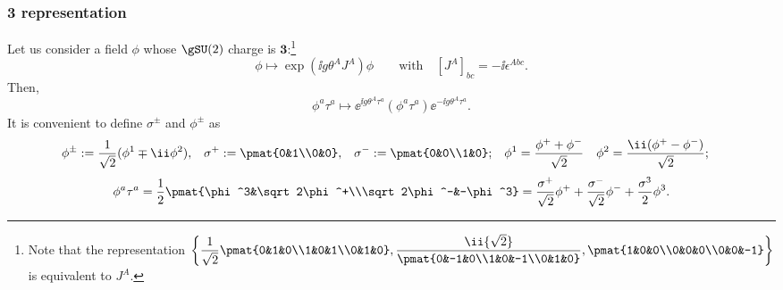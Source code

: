 \subsubsection{$\boldsymbol 3$ representation}
Let us consider a field $\phi$ whose $\gSU(2)$ charge is $\boldsymbol 3$:\footnote{
Note that the representation $\left\{
\dfrac1{\sqrt2}\pmat{0&1&0\\1&0&1\\0&1&0},
\dfrac\ii{\sqrt2}\pmat{0&-1&0\\1&0&-1\\0&1&0},
\pmat{1&0&0\\0&0&0\\0&0&-1}
\right\}$ is equivalent to $J^A$.}
\begin{equation}
 \phi\mapsto\exp\left(\ii g\theta^A J^A\right)\phi
\qquad\text{with}\quad [J^A]_{bc}=-\ii\epsilon^{Abc}.
\end{equation}
Then,
\begin{equation}
 \phi^a\tau^a\mapsto
\ee^{\ii g\theta^A\tau^a}
 \left(\phi^a\tau^a\right)
\ee^{-\ii g\theta^A\tau^a}.
\end{equation}
It is convenient to define $\sigma^\pm$ and  $\phi^\pm$ as
\begin{align}
 \phi^\pm   &:= \frac1{\sqrt2}(\phi^1\mp\ii\phi^2),&
 \sigma^+ &:= \pmat{0&1\\0&0},&
 \sigma^- &:= \pmat{0&0\\1&0};&
 \phi^1          &= \frac{\phi^++\phi^-}{\sqrt2}&
 \phi^2          &= \frac{\ii(\phi^+-\phi^-)}{\sqrt2};
\end{align}
\begin{equation}
 \phi^a\tau^a = \frac12\pmat{\phi^3&\sqrt2\phi^+\\\sqrt2\phi^-&-\phi^3}
=\frac{\sigma^+}{\sqrt2}\phi^+
+\frac{\sigma^-}{\sqrt2}\phi^-
+\frac{\sigma^3}{2}\phi^3.
\end{equation}

